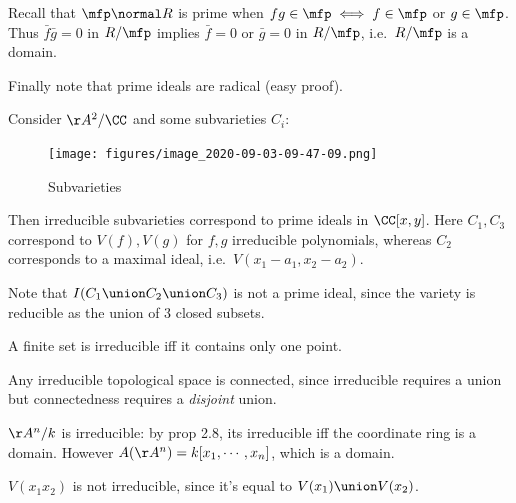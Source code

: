 Recall that \(\mfp \normal R\) is prime when
\(fg\in \mfp \iff f\in \mfp\) or \(g\in \mfp\). Thus
\(\bar f \bar g = 0\) in \(R/\mfp\) implies \(\bar f = 0\) or
\(\bar g = 0\) in \(R/\mfp\), i.e.~\(R/\mfp\) is a domain.

Finally note that prime ideals are radical (easy proof).

\begin{example}

Consider \(\AA^2/\CC\) and some subvarieties \(C_i\):

\begin{figure}
\centering
\texttt{[image: figures/image\_2020-09-03-09-47-09.png]}
\caption{Subvarieties}
\end{figure}

Then irreducible subvarieties correspond to prime ideals in
\(\CC[x, y]\). Here \(C_1, C_3\) correspond to \(V(f), V(g)\) for
\(f,g\) irreducible polynomials, whereas \(C_2\) corresponds to a
maximal ideal, i.e.~\(V(x_1 - a_1, x_2 - a_2)\).

Note that \(I(C_1 \union C_2 \union C_3)\) is not a prime ideal, since
the variety is reducible as the union of 3 closed subsets.

\end{example}

\begin{example}

A finite set is irreducible iff it contains only one point.

\end{example}

\begin{example}

Any irreducible topological space is connected, since irreducible
requires a union but connectedness requires a \emph{disjoint} union.

\end{example}

\begin{example}

\(\AA^n/k\) is irreducible: by prop 2.8, its irreducible iff the
coordinate ring is a domain. However \(A(\AA^n) = k[x_1, \cdots, x_n]\),
which is a domain.

\end{example}

\begin{example}

\(V(x_1 x_2)\) is not irreducible, since it's equal to
\(V(x_1) \union V(x_2)\).

\end{example}


